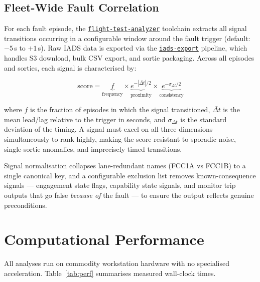 \documentclass[11pt, letterpaper]{article}
\newcommand{\repoFTA}{\href{https://github.com/francis-barchesky/flight-test-analyzer}{\texttt{flight-test-analyzer}}}
\newcommand{\repoIADS}{\href{https://github.com/merlinlabs/iads-export}{\texttt{iads-export}}}
\begin{document}
\subsection{Fleet-Wide Fault Correlation}

For each fault episode, the \repoFTA{} toolchain extracts all signal transitions
occurring in a configurable window around the fault trigger (default: $-5$\,s to
$+1$\,s). Raw IADS data is exported via the \repoIADS{} pipeline, which handles
S3 download, bulk CSV export, and sortie packaging. Across all episodes and
sorties, each signal is characterised by:

\[
  \text{score} = \underbrace{f}_{\text{frequency}}
    \times \underbrace{e^{-|\bar{\Delta t}|/2}}_{\text{proximity}}
    \times \underbrace{e^{-\sigma_{\Delta t}/2}}_{\text{consistency}}
\]

where $f$ is the fraction of episodes in which the signal transitioned,
$\bar{\Delta t}$ is the mean lead/lag relative to the trigger in seconds, and
$\sigma_{\Delta t}$ is the standard deviation of the timing. A signal must
excel on all three dimensions simultaneously to rank highly, making the score
resistant to sporadic noise, single-sortie anomalies, and imprecisely timed
transitions.

Signal normalisation collapses lane-redundant names (FCC1A vs FCC1B) to a
single canonical key, and a configurable exclusion list removes known-consequence
signals --- engagement state flags, capability state signals, and monitor trip
outputs that go false \emph{because of} the fault --- to ensure the output
reflects genuine preconditions.

\clearpage
\section{Computational Performance}

All analyses run on commodity workstation hardware with no specialised
acceleration. Table~\ref{tab:perf} summarises measured wall-clock times.
\end{document}
